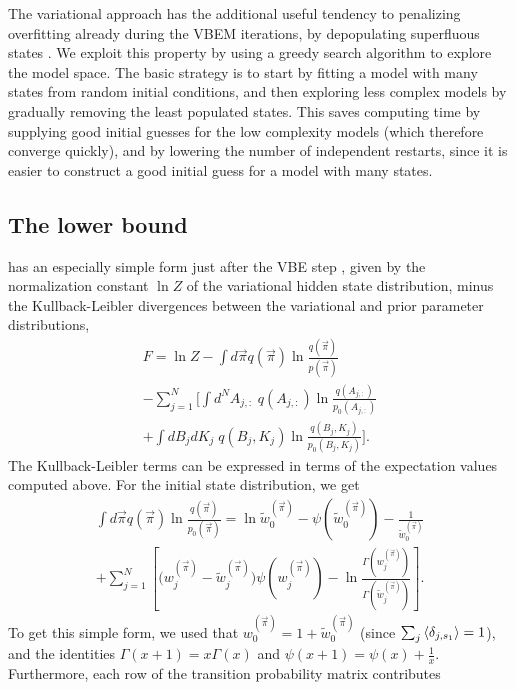 The variational approach has the additional useful tendency to
penalizing overfitting already during the VBEM iterations, by
depopulating superfluous states
\cite{mackay1997,beal2003,persson2013}. We exploit this property by
using a greedy search algorithm to explore the model space. The basic
strategy is to start by fitting a model with many states from random
initial conditions, and then exploring less complex models by
gradually removing the least populated states. This saves computing
time by supplying good initial guesses for the low complexity models
(which therefore converge quickly), and by lowering the number of
independent restarts, since it is easier to construct a good initial
guess for a model with many states.

\subsection{The lower bound}
has an especially simple form just after the VBE step
\cite{mackay1997,beal2003,persson2013}, given by the normalization
constant $\ln Z$ of the variational hidden state distribution, minus
the Kullback-Leibler divergences between the variational and prior
parameter distributions,
\begin{multline}
  F=\ln Z
  -\int d\vec{\pi} q(\vec{\pi}) \ln\frac{q(\vec{\pi})}{p(\vec{\pi})}\\
  -\sum_{j=1}^N\Bigg[
  \int d^NA_{j,:}\;q(A_{j,:})\ln\frac{q(A_{j,:})}{p_0(A_{j,:})}\\
  +\int dB_jdK_j\;q(B_j,K_j)\ln\frac{q(B_j,K_j)}{p_0(B_j,K_j)}
  \Bigg].
\end{multline}
The Kullback-Leibler terms can be expressed in terms of the
expectation values computed above. For the initial state distribution,
we get
\begin{multline}
  \int d\vec{\pi} q(\vec{\pi}) \ln\frac{q(\vec{\pi})}{p_0(\vec{\pi})}
  =\ln\tilde w_0^{(\vec{\pi})}
    -\psi(\tilde w_0^{(\vec{\pi})})-\frac{1}{\tilde w_0^{(\vec{\pi})}}\\
    +\sum_{j=1}^N\left[
      \big(w_j^{(\vec{\pi})}-\tilde w_j^{(\vec{\pi})}\big)\psi(w_j^{(\vec{\pi})})
      -\ln\frac{\Gamma(w_j^{(\vec{\pi})})}{\Gamma(\tilde w_j^{(\vec{\pi})})}
      \right].
\end{multline}
To get this simple form, we used that $w_0^{(\vec{\pi})}=1+\tilde
w_0^{(\vec{\pi})}$ (since $\sum_j\left\langle \delta_{j,s_1}\right\rangle=1$), and the
identities $\Gamma(x+1)=x\Gamma(x)$ and $\psi(x+1)=\psi(x)+\frac 1x$.
Furthermore, each row of the transition probability matrix contributes
